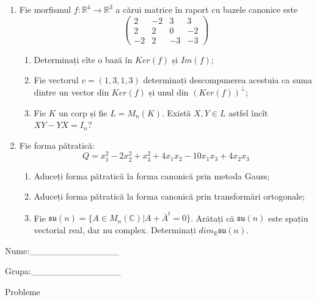 \documentclass{article}
\begin{document}
\begin{enumerate}
 \item Fie morfismul $f:\mathbb{R}^4 \to \mathbb{R}^3$ a cărui matrice în raport cu bazele canonice este
$$\begin{pmatrix}
2&-2&3&3\\
2&2&0&-2\\
-2&2&-3&-3
\end{pmatrix}$$

\begin{enumerate}
\item Determinați cîte o bază în $Ker(f)$ și $Im(f)$;
\item Fie vectorul $v=(1,3,1,3)$ determinați descompunerea acestuia ca suma dintre un vector din $Ker(f)$ și unul din $(Ker(f))^\perp$;
\item Fie $K$ un corp și fie $L=M_n(K)$. Există $X,Y \in L$ astfel încît $XY-YX=I_n$?  
\end{enumerate}
\item Fie forma pătratică:
$$Q= x_1^2-2x_2^2+x_3^2+4x_1x_2-10x_1x_3+4x_2x_3$$

\begin{enumerate}
\item Aduceți forma pătratică la forma canonică prin metoda Gauss;
\item Aduceți forma pătratică la forma canonică prin transformări ortogonale;
\item Fie $\mathfrak{su}(n)=\{ A \in M_n(\mathbb{C}) | A+\bar{A}^t=0\}$. Arătați că $\mathfrak{su}(n)$ este spațiu vectorial real, dar nu complex.
Determinați $dim_{\mathbb{R}}\mathfrak{su}(n)$.
\end{enumerate}
\end{enumerate}
\newpage
\begin{flushright}
Nume:\_\_\_\_\_\_\_\_\_\_\_\_\_\_
 
 
Grupa:\_\_\_\_\_\_\_\_\_\_\_\_\_\_
\end{flushright}
\begin{center}
\vspace{2cm}
{\Large Probleme}
\vspace{2cm}
\end{center}
\end{document}
